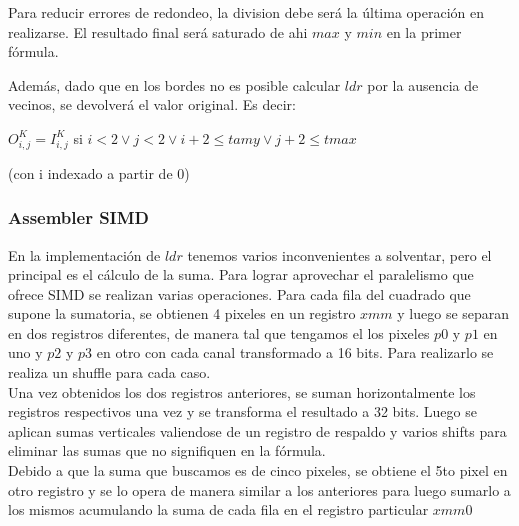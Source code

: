 Para reducir errores de redondeo, la division debe será la última operación en realizarse.
El resultado final será saturado de ahi $max$ y $min$ en la primer fórmula.

Además, dado que en los bordes no es posible calcular $ldr$ por la ausencia de vecinos, se devolverá
el valor original. Es decir:

\begin{center}
$O_{i,j}^{K} = I_{i,j}^{K}$ si $i<2 \vee j<2 \vee i+2 \leq tamy \vee j +2 \leq tmax$
\end{center}

(con i indexado a partir de 0)

\subsubsection{Assembler SIMD}

En la implementación de $ldr$ tenemos varios inconvenientes a solventar, pero el principal es el cálculo de la suma. Para lograr aprovechar el paralelismo que ofrece SIMD se realizan varias operaciones.
Para cada fila del cuadrado que supone la sumatoria, se obtienen 4 pixeles en un registro $xmm$ y luego se separan en dos registros diferentes, de manera tal que tengamos el los pixeles $p0$ y $p1$ en uno y $p2$ y $p3$ en otro con cada canal transformado a 16 bits. Para realizarlo se realiza un shuffle para cada caso.\\

Una vez obtenidos los dos registros anteriores, se suman horizontalmente los registros respectivos una vez y se transforma el resultado a 32 bits. Luego se aplican sumas verticales valiendose de un registro de respaldo y varios shifts para eliminar las sumas que no signifiquen en la fórmula.\\

Debido a que la suma que buscamos es de cinco pixeles, se obtiene el 5to pixel en otro registro y se lo opera de manera similar a los anteriores para luego sumarlo a los mismos acumulando la suma de cada fila en el registro particular $xmm0$

